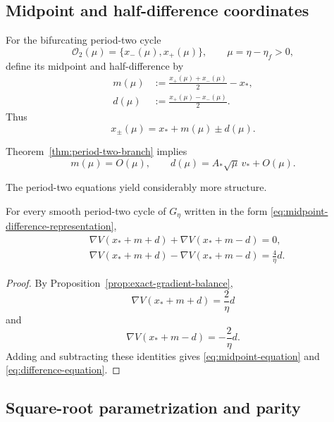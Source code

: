 \subsection{Midpoint and half-difference coordinates}
\label{subsec:midpoint-difference}

For the bifurcating period-two cycle
\[
\mathcal O_2(\mu)
=
\{x_-(\mu),x_+(\mu)\},
\qquad
\mu=\eta-\eta_f>0,
\]
define its midpoint and half-difference by
\begin{align}
m(\mu)
&:=
\frac{x_+(\mu)+x_-(\mu)}{2}-x_*,
\label{eq:midpoint-definition}
\\
d(\mu)
&:=
\frac{x_+(\mu)-x_-(\mu)}{2}.
\label{eq:half-difference-definition}
\end{align}
Thus
\begin{equation}
x_\pm(\mu)
=
x_*+m(\mu)\pm d(\mu).
\label{eq:midpoint-difference-representation}
\end{equation}

Theorem~\ref{thm:period-two-branch} implies
\begin{equation}
m(\mu)=O(\mu),
\qquad
d(\mu)
=
A_*\sqrt{\mu}\,v_*
+
O(\mu).
\label{eq:rough-md-orders}
\end{equation}

The period-two equations yield considerably more structure.

\begin{lemma}
\label{lem:midpoint-difference-equations}
For every smooth period-two cycle of $G_\eta$ written in the form
\eqref{eq:midpoint-difference-representation},
\begin{align}
&
\nabla V(x_*+m+d)
+
\nabla V(x_*+m-d)
=
0,
\label{eq:midpoint-equation}
\\
&
\nabla V(x_*+m+d)
-
\nabla V(x_*+m-d)
=
\frac{4}{\eta}d.
\label{eq:difference-equation}
\end{align}
\end{lemma}

\begin{proof}
By Proposition~\ref{prop:exact-gradient-balance},
\[
\nabla V(x_*+m+d)
=
\frac{2}{\eta}d
\]
and
\[
\nabla V(x_*+m-d)
=
-\frac{2}{\eta}d.
\]
Adding and subtracting these identities gives
\eqref{eq:midpoint-equation} and
\eqref{eq:difference-equation}.
\end{proof}

\subsection{Square-root parametrization and parity}
\label{subsec:square-root-parity}

